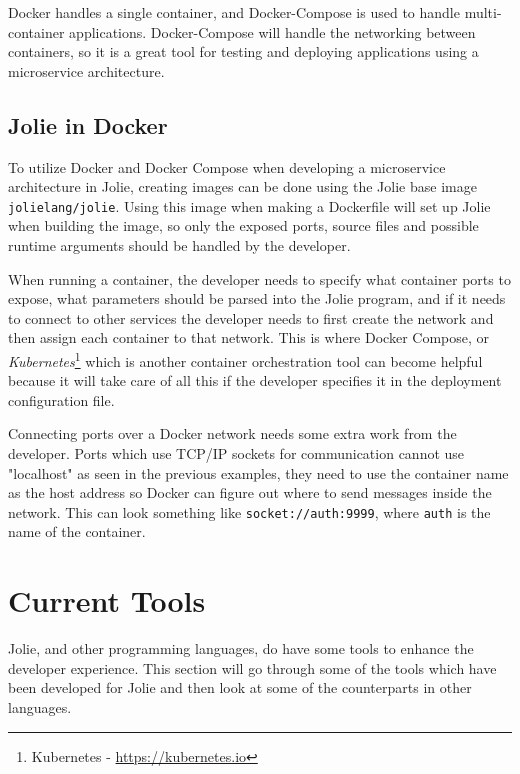 Docker handles a single container, and Docker-Compose is used to handle multi-container applications. Docker-Compose will handle the networking between containers, so it is a great tool for testing and deploying applications using a microservice architecture.

\subsection{Jolie in Docker}
\label{label:jolie_in_docker}
To utilize Docker and Docker Compose when developing a microservice architecture in Jolie, creating images can be done using the Jolie base image \texttt{jolielang/jolie}.
Using this image when making a Dockerfile will set up Jolie when building the image, so only the exposed ports, source files and possible runtime arguments should be handled by the developer.

When running a container, the developer needs to specify what container ports to expose, what parameters should be parsed into the Jolie program, and if it needs to connect to other services the developer needs to first create the network and then assign each container to that network.
This is where Docker Compose, or \emph{Kubernetes}\footnote{Kubernetes - \url{https://kubernetes.io}} which is another container orchestration tool can become helpful because it will take care of all this if the developer specifies it in the deployment configuration file.

Connecting ports over a Docker network needs some extra work from the developer. Ports which use TCP/IP sockets for communication cannot use "localhost" as seen in the previous examples, they need to use the container name as the host address so Docker can figure out where to send messages inside the network.
This can look something like \texttt{socket://auth:9999}, where \texttt{auth} is the name of the container.

\section{Current Tools}
Jolie, and other programming languages, do have some tools to enhance the developer experience. This section will go through some of the tools
which have been developed for Jolie and then look at some of the counterparts in other languages.
%
